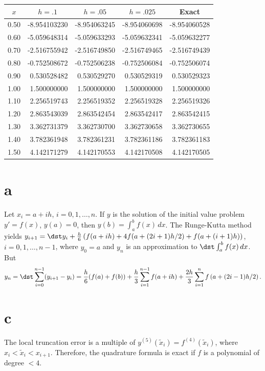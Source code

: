 \documentclass[dvips]{book}
\renewcommand{\exer}[1]{\par\medskip\;\noindent{\color{red}\bf #1.}}
\numberwithin{example}{section}
\numberwithin{equation}{section}
\numberwithin{theorem}{section}
\numberwithin{table}{section}
\numberwithin{figure}{section}
\begin{document}
\exer{3.3.26}
{\small
\begin{tabular}{|r|r|r|r|r|}
\hline
\multicolumn{1}{|c|}{$x$}&
\multicolumn{1}{|c|}{$h=.1$}&
\multicolumn{1}{|c|}{$h=.05$}&
\multicolumn{1}{|c|}{$h=.025$}&
\multicolumn{1}{|c|}{Exact}\\ \hline
 0.50  &  -8.954103230 & -8.954063245 &  -8.954060698 & -8.954060528 \\
 0.60  &  -5.059648314 & -5.059633293 &  -5.059632341 & -5.059632277 \\
 0.70  &  -2.516755942 & -2.516749850 &  -2.516749465 & -2.516749439 \\
 0.80  &  -0.752508672 & -0.752506238 &  -0.752506084 & -0.752506074 \\
 0.90  &   0.530528482 &  0.530529270 &   0.530529319 &  0.530529323 \\
 1.00  &   1.500000000 &  1.500000000 &   1.500000000 &  1.500000000 \\
 1.10  &   2.256519743 &  2.256519352 &   2.256519328 &  2.256519326 \\
 1.20  &   2.863543039 &  2.863542454 &   2.863542417 &  2.863542415 \\
 1.30  &   3.362731379 &  3.362730700 &   3.362730658 &  3.362730655 \\
 1.40  &   3.782361948 &  3.782361231 &   3.782361186 &  3.782361183 \\
 1.50  &   4.142171279 &  4.142170553 &   4.142170508 &  4.142170505 \\
\hline
\end{tabular}}



\exer{3.3.28}
\part{a}
Let $x_i=a+ih$, $i=0,1,\dots,n$. If $y$ is the solution of the initial
value problem $y'=f(x)$, $y(a)=0$, then $y(b)=\int_a^bf(x)\,dx$.
The Runge-Kutta method yields
$y_{i+1}=\dst
y_i+{h\over6}\left(f(a+ih)+4f(a+(2i+1)h/2)+f(a+(i+1)h)\right)$,
$i=0,1,\dots,n-1$,
where $y_0=a$ and $y_n$ is an approximation to $\dst\int_a^bf(x)\,dx$.
But
$$
y_n=\dst\sum_{i=0}^{n-1}(y_{i+1}-y_i) =
{h\over6}(f(a)+f(b))+
{h\over3}\sum_{i=1}^{n-1}f(a+ih)+{2h\over3}\sum_{i=1}^n
f\left(a+(2i-1)h/2\right).
$$




\part{c} The local truncation error is a multiple of
$y^{(5)}(\tilde x_i)=f^{(4)}(\tilde x_i)$, where $x_i<\tilde
x_i<x_{i+1}$. Therefore, the quadrature formula is exact
if $f$ is a polynomial of degree $<4$.
\end{document}
